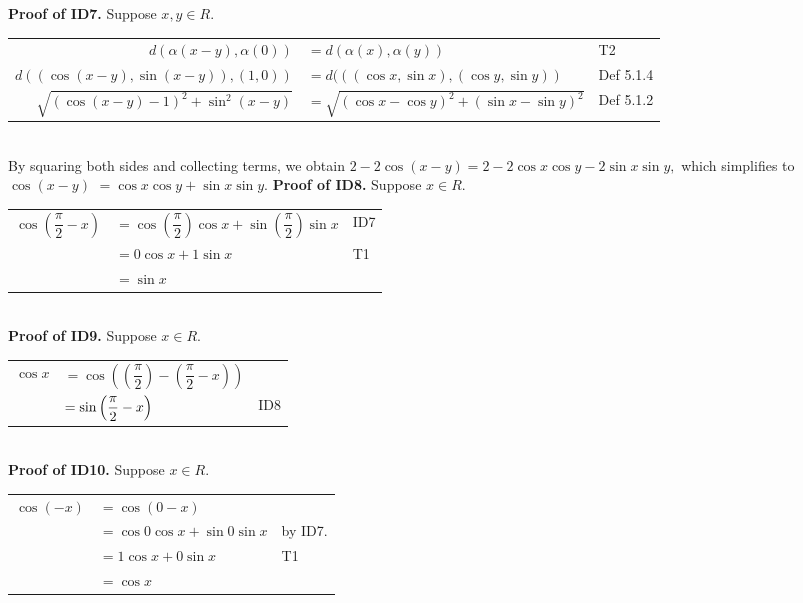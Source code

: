 \textbf{Proof of ID7.} Suppose $x,y\in R.$ \nl
\begin{tabular}{r l l}
$d(\alpha(x-y),\alpha(0))$&$= d(\alpha(x), \alpha(y)) $& T2 \\
$d((\cos (x-y), \sin (x-y)), (1,0))$&$=d(((\cos x, \sin x),( \cos y, \sin y))$ &Def 5.1.4\\
$\sqrt{(\cos(x-y)- 1)^2 + \sin^{2}(x-y)}$&$=\sqrt{(\cos x - \cos y)^2 + (\sin x - \sin y)^2}$ &  Def 5.1.2 \\
\end{tabular}\\
By squaring both sides and collecting terms, we obtain \nl
$2 - 2\cos(x-y) = 2-2\cos x\cos y- 2\sin x\sin y,$ which simplifies to
$\cos(x-y)$ $= \cos x\cos y + \sin x \sin y.$\nl
\textbf{Proof of ID8.} Suppose $x \in R.$ \nl
\begin{tabular}{r l l}
$\cos\left(\dfrac{\pi}{2}-x\right)$ &$= \cos\left(\dfrac{\pi}{2}\right)\cos x + \sin\left(\dfrac{\pi}{2}\right) \sin x$ &ID7\\
&$= 0\cos x + 1\sin x$ &T1\\
&$ =\sin x$ &\\
\end{tabular}\\
\textbf{Proof of ID9.} Suppose $x\in R.$\nl
\begin{tabular}{r l l}
$\cos x$ &$= \cos\left(\left(\dfrac{\pi}{2}\right) - \left(\dfrac{\pi}{2} -x\right)\right)$ & \\
&$=\sin\left(\dfrac{\pi}{2} - x\right)$ &ID8\\
\end{tabular}\\
\textbf{Proof of ID10.} Suppose $x\in R.$ \nl
\begin{tabular}{r l l}
$\cos(-x)$ &$= \cos(0 - x)$& \\
&$ = \cos 0 \cos x + \sin 0 \sin x$& by ID7. \\
&$= 1\cos x + 0\sin x$&T1\\
&$= \cos x$&\\
\end{tabular}\\
\newpage

